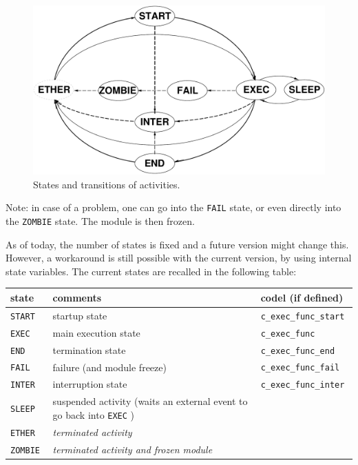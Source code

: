 \begin{figure}[htbp]
\centering
\includegraphics[width=0.8\hsize]{fig/activity-states}
\caption{States and transitions of activities.}
\label{fig|states}
\end{figure}

Note: in case of a problem, one can go into the {\tt FAIL} state, or even
directly into the {\tt ZOMBIE} state. The module is then frozen.

As of today, the  number of states is fixed  and  a future version  might
change this.  However, a workaround  is  still possible with the  current
version, by using internal   state   variables. The current  states   are
recalled in the following table:

\bigbreak

{\small\begin{tabularx}{0.8\linewidth}{|l||X|l|}
\hline
state 	& comments 	& codel (if defined)	  \\
\hline
\tt START  & startup state 
		& \tt c\_exec\_func\_start 	\\
\tt EXEC   & main execution state & \tt c\_exec\_func  \\
\tt END    & termination state 	& \tt c\_exec\_func\_end \\
\tt FAIL   & failure (and module freeze) \em 
					& \tt c\_exec\_func\_fail \\
\hline
\tt INTER  & interruption state 
					& \tt c\_exec\_func\_inter  \\
\hline
\tt SLEEP     	&  suspended activity (waits an external event to go back
into  {\tt EXEC} ) & \\
\tt ETHER    	& \em terminated activity  & \\
\tt ZOMBIE   	& \em terminated activity and frozen module & \\
\hline
\end{tabularx}}

\bigbreak

